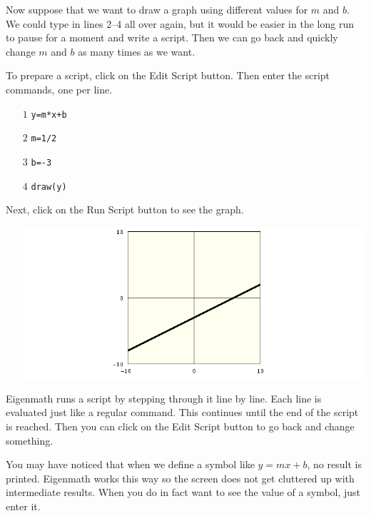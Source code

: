 \documentclass[12pt,openany]{report}
\begin{document}
\newpage

\noindent
Now suppose that we want to draw a graph
using different values for $m$ and $b$.
We could type in lines 2--4 all over again, but it would be easier
in the long run to pause for a moment and write a script.
Then we can go back and quickly change $m$ and $b$ as many times as we want.

\medskip
\noindent
To prepare a script, click on the Edit Script button.
Then enter the script commands, one per line.

\medskip
\noindent
\begin{itemize}
\item[$\scriptstyle1$]{\tt y=m*x+b}
\item[$\scriptstyle2$]{\tt m=1/2}
\item[$\scriptstyle3$]{\tt b=-3}
\item[$\scriptstyle4$]{\tt draw(y)}
\end{itemize}

\medskip
\noindent
Next, click on the Run Script button to see the graph.

\medskip
\noindent
\begin{itemize}
\item[]\includegraphics[scale=0.5]{1.png}
\end{itemize}

\medskip
\noindent
Eigenmath runs a script by stepping through it line by line.
Each line is evaluated just like a regular command.
This continues until the end of the script is reached.
Then you can click on the Edit Script button to go back and change something.

\newpage

\noindent
You may have noticed that when we define a symbol
like $y=mx+b$, no result is printed.
Eigenmath works this way so the screen does not get cluttered
up with intermediate results.
When you do in fact want to see the value of a symbol, just enter it.
\end{document}
